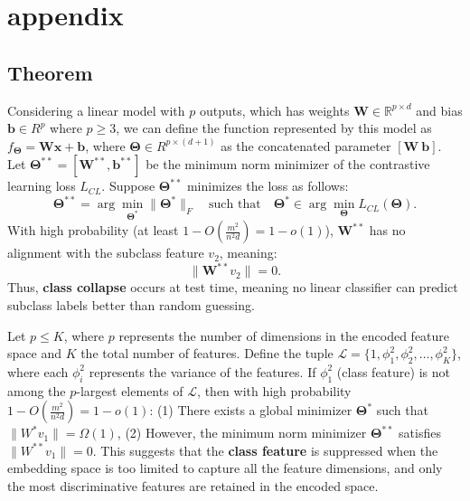 \section{appendix}
\subsection{Theorem}
\begin{theorem} \label{class-collapse}
    Considering a linear model with $p$ outputs, which has weights $\mathbf{W}\in \mathbb{R}^{p\times d}$ and bias $\mathbf{b}\in R^{p} $ where $p\ge 3 $, we can define the function represented by this model as $f_{\mathbf{\Theta}}=\mathbf{Wx}+\mathbf{b}$, where $\mathbf{\Theta}\in R^{p\times (d+1)}$ as the concatenated parameter $[\mathbf{W}\ \mathbf{b}]$.
    Let \( \mathbf{\Theta}^{**} = [\mathbf{W}^{**}, \mathbf{b}^{**}] \) be the minimum norm minimizer of the contrastive learning loss \( L_{CL} \). Suppose \( \mathbf{\Theta}^{**} \) minimizes the loss as follows:
    \[
    \mathbf{\Theta}^{**} = \arg\min_{\mathbf{\Theta}^{*}} \|\mathbf{\Theta}^{*}\|_F \quad \text{such that} \quad \mathbf{\Theta}^{*} \in \arg\min_{\mathbf{\Theta}} L_{CL}(\mathbf{\Theta}).
    \]
    With high probability (at least \( 1 - O\left(\frac{m^2}{n^2 d}\right) = 1 - o(1) \)), \( \mathbf{W}^{**} \) has no alignment with the subclass feature \( v_2 \), meaning:
    \[
    \|\mathbf{W}^{**} v_2\| = 0.
    \]
    Thus, \textbf{class collapse} occurs at test time, meaning no linear classifier can predict subclass labels better than random guessing.
\end{theorem}


\begin{theorem} \label{feature-suppression}
   Let \( p \leq K \), where \( p \) represents the number of dimensions in the encoded feature space and \( K \) the total number of features. Define the tuple \( \mathcal{L} = \{1, \phi_1^2, \phi_2^2, \dots, \phi_K^2\} \), where each \( \phi_i^2 \) represents the variance of the features. If \( \phi_1^2 \) (class feature) is not among the \( p \)-largest elements of \( \mathcal{L} \), then with high probability \( 1 - O\left(\frac{m^2}{n^2 d}\right) = 1 - o(1) \):
        (1) There exists a global minimizer \( \mathbf{\Theta}^{*} \) such that \( \|W^{*} v_1\| = \Omega(1) \),
        (2) However, the minimum norm minimizer \( \mathbf{\Theta}^{**} \) satisfies \( \|W^{**} v_1\| = 0 \).
This suggests that the \textbf{class feature} is suppressed when the embedding space is too limited to capture all the feature dimensions, and only the most discriminative features are retained in the encoded space. 
\end{theorem}

